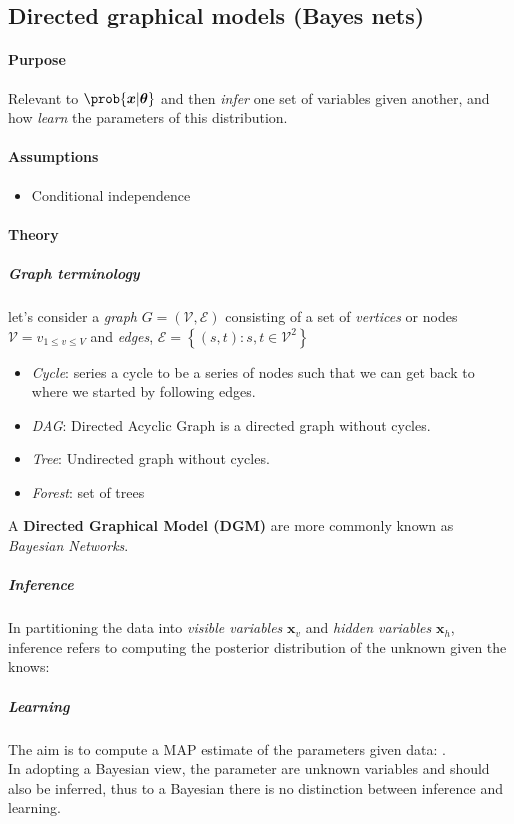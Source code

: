 \subsection{Directed graphical models (Bayes nets)}
\paragraph{Purpose}
Relevant to  $\prob{\bm{x}|\bm{\theta}}$ and 
then \textit{infer} one set of variables given another, and how \textit{learn} the
parameters of this distribution.
\paragraph{Assumptions}
\begin{itemize}
    \item Conditional independence
\end{itemize}

\paragraph{Theory}
\subparagraph{Graph terminology}
let's consider a \emph{graph} $G=(\mathcal{V}, \mathcal{E})$ consisting of a set of 
\emph{vertices} or nodes $\mathcal{V} = {v}_{1\leq v\leq V}$ and \emph{edges}, 
$\mathcal{E} = \left\{(s,t): s,t\in\mathcal{V}^{2}\right\}$
\begin{itemize}
    \item \emph{Cycle}: series a cycle to be a series of nodes such that we can get 
        back to where we started by following edges.
    \item \emph{DAG}: Directed Acyclic Graph is a directed graph without cycles.
    \item \emph{Tree}: Undirected graph without cycles.
    \item \emph{Forest}: set of trees
\end{itemize}
A \textbf{Directed Graphical Model (DGM)} are more commonly known as \emph{Bayesian 
Networks}.\\
\subparagraph{Inference}
In partitioning the data into \emph{visible variables} $\bm{x}_{v}$ and \emph{hidden
variables} $\bm{x}_{h}$, inference refers to computing the posterior distribution of 
the unknown given the knows:
\begin{center}
\end{center}
\subparagraph{Learning}
The aim is to compute a MAP estimate of the parameters given data:
.\\
In adopting a Bayesian view, the parameter are unknown variables and should also be inferred,
thus to a Bayesian there is no distinction between inference and learning.

